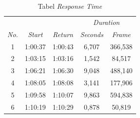 \begin{table}[]
\centering
\caption{Tabel \textit{Response Time}}
\label{tb:4_4}
\begin{tabular}{|c|c|c|c|c|}
\hline
{\color[HTML]{000000} }                               & {\color[HTML]{000000} }                                 & {\color[HTML]{000000} }                                  & \multicolumn{2}{c|}{{\color[HTML]{000000} \textit{Duration}}}                   \\ \cline{4-5} 
\multirow{-2}{*}{{\color[HTML]{000000} \textit{No.}}} & \multirow{-2}{*}{{\color[HTML]{000000} \textit{Start}}} & \multirow{-2}{*}{{\color[HTML]{000000} \textit{Return}}} & {\color[HTML]{000000} \textit{Seconds}} & {\color[HTML]{000000} \textit{Frame}} \\ \hline
{\color[HTML]{000000} 1}                              & {\color[HTML]{000000} 1:00:37}                          & {\color[HTML]{000000} 1:00:43}                           & {\color[HTML]{000000} 6,707}            & {\color[HTML]{000000} 366,538}        \\ \hline
{\color[HTML]{000000} 2}                              & {\color[HTML]{000000} 1:03:15}                          & {\color[HTML]{000000} 1:03:16}                           & {\color[HTML]{000000} 1,542}            & {\color[HTML]{000000} 84,517}         \\ \hline
{\color[HTML]{000000} 3}                              & {\color[HTML]{000000} 1:06:21}                          & {\color[HTML]{000000} 1:06:30}                           & {\color[HTML]{000000} 9,048}            & {\color[HTML]{000000} 488,140}        \\ \hline
{\color[HTML]{000000} 4}                              & {\color[HTML]{000000} 1:08:05}                          & {\color[HTML]{000000} 1:08:08}                           & {\color[HTML]{000000} 3,141}            & {\color[HTML]{000000} 177,906}        \\ \hline
{\color[HTML]{000000} 5}                              & {\color[HTML]{000000} 1:09:58}                          & {\color[HTML]{000000} 1:10:07}                           & {\color[HTML]{000000} 9,863}            & {\color[HTML]{000000} 594,838}        \\ \hline
{\color[HTML]{000000} 6}                              & {\color[HTML]{000000} 1:10:19}                          & {\color[HTML]{000000} 1:10:29}                           & {\color[HTML]{000000} 0,878}            & {\color[HTML]{000000} 50,819}         \\ \hline

\end{tabular}
\end{table}
